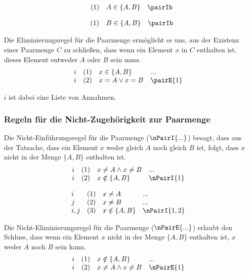 \documentclass{book}
\theoremstyle{plain}
\theoremstyle{remark}
\theoremstyle{definition}
\begin{document}
\[
\begin{array}{llll}
	& (1) & A\in \{A,B\} & \pairIb \\
\end{array}
\]

\[
\begin{array}{llll}
	& (1) & B\in \{A,B\} & \pairIb \\
\end{array}
\]


Die Eliminierungsregel für die Paarmenge ermöglicht es uns, aus der Existenz einer Paarmenge \(C\) zu schließen, dass wenn ein Element \(x\) in \(C\) enthalten ist, dieses Element entweder \(A\) oder \(B\) sein muss.
\[
\begin{array}{llll}
	i & (1) & x\in \{A,B\} & ... \\
	i & (2) & x = A\lor x = B & \pairE{1} \\
\end{array}
\]

\(i\) ist dabei eine Liste von Annahmen.

\subsubsection{Regeln für die Nicht-Zugehörigkeit zur Paarmenge}
\label{rule:nPairI} \label{rule:nPairE}
Die Nicht-Einführungsregel für die Paarmenge (\(\nPairI{...}\)) besagt, dass aus der Tatsache, dass ein Element \(x\) weder gleich \(A\) noch gleich \(B\) ist, folgt, dass \(x\) nicht in der Menge \(\{A, B\}\) enthalten ist.
\[
\begin{array}{llll}
	i & (1) & x \neq A \land x \neq B & ... \\
	i & (2) & x \notin \{A,B\} & \nPairI{1} \\
\end{array}
\]

\[
\begin{array}{llll}
	i & (1) & x \neq A  & ... \\
	j & (2) & x \neq B  & ... \\
	i,j & (3) & x \notin \{A,B\} & \nPairI{1,2} \\
\end{array}
\]

Die Nicht-Eliminierungsregel für die Paarmenge (\(\nPairE{...}\)) erlaubt den Schluss, dass wenn ein Element \(x\) nicht in der Menge \(\{A, B\}\) enthalten ist, \(x\) weder \(A\) noch \(B\) sein kann.
\[
\begin{array}{llll}
	i & (1) & x \notin \{A,B\} & ... \\
	i & (2) & x \neq A \land x \neq B & \nPairE{1} \\
\end{array} 
\]
\end{document}
